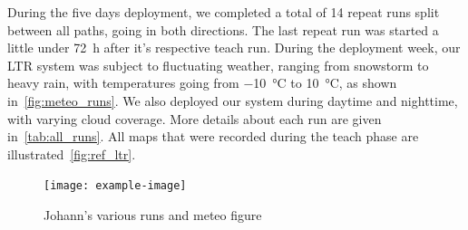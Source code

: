 During the five days deployment, we completed a total of 14 repeat runs split between all paths, going in both directions.
The last repeat run was started a little under \SI{72}{h} after it's respective teach run. 
During the deployment week, our \ac{LTR} system was subject to fluctuating weather, ranging from snowstorm to heavy rain, with temperatures going from \SI{-10}{\celsius} to \SI{10}{\celsius}, as shown in~\autoref{fig:meteo_runs}.
We also deployed our system during daytime and nighttime, with varying cloud coverage.
More details about each run are given in~\autoref{tab:all_runs}.
All maps that were recorded during the teach phase are illustrated~\autoref{fig:ref_ltr}.

\begin{figure} [htpb]
	\centering
	\texttt{[image: example-image]}
	\caption{Johann's various runs and meteo figure}
	\label{fig:meteo_runs}
\end{figure}

